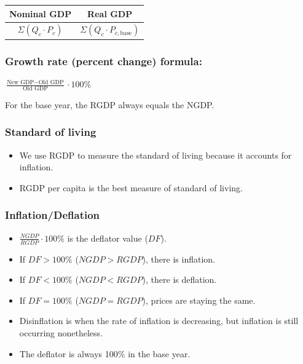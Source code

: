 \documentclass[
  letterpaper,
  DIV=11,
  numbers=noendperiod]{scrartcl}
\providecommand{\tightlist}{%
  \setlength{\itemsep}{0pt}\setlength{\parskip}{0pt}}\usepackage{longtable,booktabs,array}
\begin{document}
\begin{longtable}[]{@{}cc@{}}
\toprule\noalign{}
Nominal GDP & Real GDP \\
\midrule\noalign{}
\endhead
\bottomrule\noalign{}
\endlastfoot
\(\Sigma (Q_c \cdot P_c)\) & \(\Sigma (Q_c \cdot P_{c,\text{base}})\) \\
\end{longtable}

\subsubsection{Growth rate (percent change)
formula:}\label{growth-rate-percent-change-formula}

\(\frac{\text{New GDP}-\text{Old GDP}}{\text{Old GDP}} \cdot 100\%\)

For the base year, the RGDP always equals the NGDP.

\subsubsection{Standard of living}\label{standard-of-living}

\begin{itemize}
\tightlist
\item
  We use RGDP to measure the standard of living because it accounts for
  inflation.
\item
  RGDP per capita is the best measure of standard of living.
\end{itemize}

\subsubsection{Inflation/Deflation}\label{inflationdeflation}

\begin{itemize}
\tightlist
\item
  \(\frac{NGDP}{RGDP} \cdot 100\%\) is the deflator value (\(DF\)).
\item
  If \(DF > 100\%\) (\(NGDP > RGDP\)), there is inflation.
\item
  If \(DF < 100\%\) (\(NGDP < RGDP\)), there is deflation.
\item
  If \(DF = 100\%\) (\(NGDP = RGDP\)), prices are staying the same.
\item
  Disinflation is when the rate of inflation is decreasing, but
  inflation is still occurring nonetheless.
\item
  The deflator is always 100\% in the base year.
\end{itemize}
\end{document}
